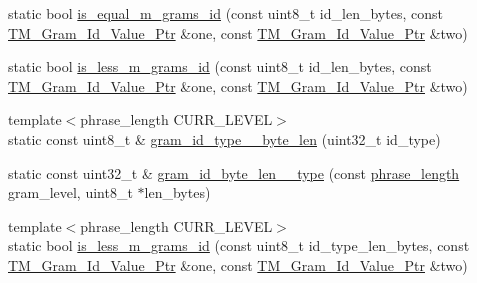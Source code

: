 \begin{DoxyCompactItemize}
static bool \hyperlink{classuva_1_1smt_1_1bpbd_1_1server_1_1lm_1_1m__grams_1_1m__gram__id_1_1_byte___m___gram___id_aaeefe0aff4934f7eefa38d6f02d9bc89}{is\+\_\+equal\+\_\+m\+\_\+grams\+\_\+id} (const uint8\+\_\+t id\+\_\+len\+\_\+bytes, const \hyperlink{namespaceuva_1_1smt_1_1bpbd_1_1server_1_1lm_1_1m__grams_1_1m__gram__id_aa605051ded9336178d905e9581702378}{T\+M\+\_\+\+Gram\+\_\+\+Id\+\_\+\+Value\+\_\+\+Ptr} \&one, const \hyperlink{namespaceuva_1_1smt_1_1bpbd_1_1server_1_1lm_1_1m__grams_1_1m__gram__id_aa605051ded9336178d905e9581702378}{T\+M\+\_\+\+Gram\+\_\+\+Id\+\_\+\+Value\+\_\+\+Ptr} \&two)
\item 
static bool \hyperlink{classuva_1_1smt_1_1bpbd_1_1server_1_1lm_1_1m__grams_1_1m__gram__id_1_1_byte___m___gram___id_a7838edc1c5fa9e9073b76bd4d36ccdb8}{is\+\_\+less\+\_\+m\+\_\+grams\+\_\+id} (const uint8\+\_\+t id\+\_\+len\+\_\+bytes, const \hyperlink{namespaceuva_1_1smt_1_1bpbd_1_1server_1_1lm_1_1m__grams_1_1m__gram__id_aa605051ded9336178d905e9581702378}{T\+M\+\_\+\+Gram\+\_\+\+Id\+\_\+\+Value\+\_\+\+Ptr} \&one, const \hyperlink{namespaceuva_1_1smt_1_1bpbd_1_1server_1_1lm_1_1m__grams_1_1m__gram__id_aa605051ded9336178d905e9581702378}{T\+M\+\_\+\+Gram\+\_\+\+Id\+\_\+\+Value\+\_\+\+Ptr} \&two)
\item 
{\footnotesize template$<$phrase\+\_\+length C\+U\+R\+R\+\_\+\+L\+E\+V\+E\+L$>$ }\\static const uint8\+\_\+t \& \hyperlink{classuva_1_1smt_1_1bpbd_1_1server_1_1lm_1_1m__grams_1_1m__gram__id_1_1_byte___m___gram___id_adbc041f76b6f44e7ab99b951d2b2f254}{gram\+\_\+id\+\_\+type\+\_\+\_\+byte\+\_\+len} (uint32\+\_\+t id\+\_\+type)
\item 
static const uint32\+\_\+t \& \hyperlink{classuva_1_1smt_1_1bpbd_1_1server_1_1lm_1_1m__grams_1_1m__gram__id_1_1_byte___m___gram___id_ae03063ed14c525ffd537bb422ee8681f}{gram\+\_\+id\+\_\+byte\+\_\+len\+\_\+\_\+type} (const \hyperlink{namespaceuva_1_1smt_1_1bpbd_1_1server_af068a19c2e03116caf3e3827a3e40e35}{phrase\+\_\+length} gram\+\_\+level, uint8\+\_\+t $\ast$len\+\_\+bytes)
\item 
{\footnotesize template$<$phrase\+\_\+length C\+U\+R\+R\+\_\+\+L\+E\+V\+E\+L$>$ }\\static bool \hyperlink{classuva_1_1smt_1_1bpbd_1_1server_1_1lm_1_1m__grams_1_1m__gram__id_1_1_byte___m___gram___id_ad30665041ed339e94bd8afd2c89bdadc}{is\+\_\+less\+\_\+m\+\_\+grams\+\_\+id} (const uint8\+\_\+t id\+\_\+type\+\_\+len\+\_\+bytes, const \hyperlink{namespaceuva_1_1smt_1_1bpbd_1_1server_1_1lm_1_1m__grams_1_1m__gram__id_aa605051ded9336178d905e9581702378}{T\+M\+\_\+\+Gram\+\_\+\+Id\+\_\+\+Value\+\_\+\+Ptr} \&one, const \hyperlink{namespaceuva_1_1smt_1_1bpbd_1_1server_1_1lm_1_1m__grams_1_1m__gram__id_aa605051ded9336178d905e9581702378}{T\+M\+\_\+\+Gram\+\_\+\+Id\+\_\+\+Value\+\_\+\+Ptr} \&two)

\end{DoxyCompactItemize}
